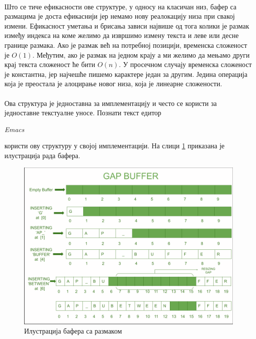\documentclass[12pt,oneside]{memoir}
\begin{document}
\paragraph{}
Што се тиче ефикасности ове структуре, у односу на класичан низ, бафер са размацима је доста 
ефикаснији јер немамо нову реалокацију низа при свакој измени. Ефикасност уметања и 
брисања зависи највише од тога колики је размак између индекса на коме желимо да 
извршимо измену текста и леве или десне границе размака. Ако је размак већ на потребној позицији, 
временска сложеност је \(O(1)\). Међутим, ако је размак на једном крају а ми желимо да 
мењамо други крај текста сложеност ће бити \(O(n)\). У просечном случају временска 
сложеност је константна, јер најчешће пишемо карактере један за другим. 
Једина операција која је преостала је алоцирање новог низа, која је линеарне сложености.

\paragraph{}
Ова структура је једноставна за имплементацију и често се користи за једноставне текстуалне
уносе. Познати текст едитор \begin{latinica}\textit{Emacs}\end{latinica} \cite{Emacs} користи 
ову структуру у својој имплементацији. На слици \ref{fig:gap_buffer} приказана је илустрација
рада бафера.

\begin{figure}[!ht]
  \centering
  \includegraphics[width=1.0\textwidth]{images/gap_buffer.png}
  \caption{Илустрација бафера са размаком}
  \label{fig:gap_buffer}
\end{figure}
\end{document}
